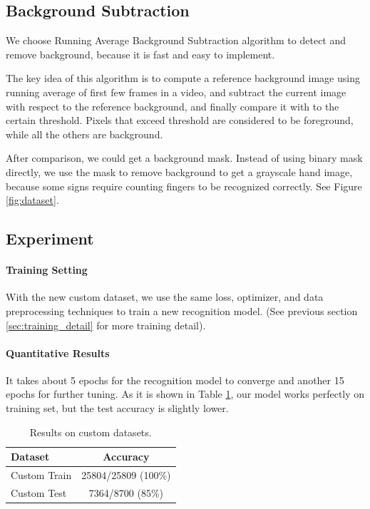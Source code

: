 \documentclass[10pt,twocolumn,letterpaper]{article}
\begin{document}
\subsection{Background Subtraction}

We choose Running Average Background Subtraction algorithm to detect and remove background, because it is fast and easy to implement.

The key idea of this algorithm is to compute a reference background image using running average of first few frames in a video, and subtract the current image with respect to the reference background, and finally compare it with  to the certain threshold. Pixels that exceed threshold are considered to be foreground, while all the others are background.
 
 After comparison, we could get a background mask. Instead of using binary mask directly, we use the mask to remove background to get a grayscale hand image, because some signs require counting fingers to be recognized correctly. See Figure \ref{fig:dataset}.


\subsection{Experiment}

\paragraph{Training Setting}
With the new custom dataset, we use the same loss, optimizer, and data preprocessing techniques to train a new recognition model. (See previous section \ref{sec:training_detail} for more training detail).

\paragraph{Quantitative Results}
It takes about 5 epochs for the recognition model to converge and another 15 epochs for further tuning. As it is shown in Table \ref{table:result}, our model works perfectly on training set, but the test accuracy is slightly lower.

\begin{table}[h]
\begin{center}
\begin{tabular}{|l|c|}
\hline
Dataset & Accuracy \\
\hline\hline
Custom Train & 25804/25809 (100\%) \\
Custom Test & 7364/8700 (85\%) \\
\hline
\end{tabular}
\end{center}
\caption{Results on custom datasets.}
\label{table:result}
\end{table}
\end{document}
